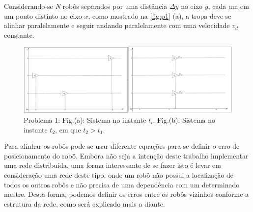 Considerando-se \emph{N} robôs separados por uma distância $\Delta$$y$ no eixo $y$, cada um em um ponto distinto no eixo $x$, como mostrado na \autoref{fig:p1} (a), a tropa deve se alinhar paralelamente e seguir andando paralelamente com uma velocidade $v_{d}$ constante.

\begin{figure}[!htb]
	\centering
	\includegraphics[width=16cm]{./04-figuras/p1}
	\caption{Problema 1: Fig.(a): Sistema no instante $t_{i}$. Fig.(b): Sistema no instante $t_{2}$, em que $t_{2}$$>$$t_{1}$.}
	\label{fig:p1}
\end{figure}

Para alinhar os robôs pode-se usar diferente equações para se definir o erro de posicionamento do robô. Embora não seja a intenção deste trabalho implementar uma rede distribuída, uma forma interessante de se fazer isto é levar em consideração uma rede deste tipo, onde um robô não possui a localização de todos os outros robôs e não precisa de uma dependência com um determinado mestre. Desta forma, podemos definir os erros entre os robôs vizinhos conforme a estrutura da rede, como será explicado mais a diante.

